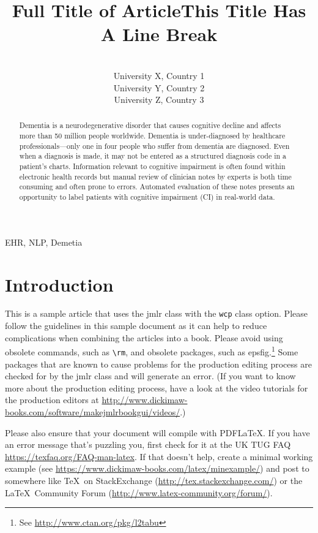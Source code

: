 \documentclass[pmlr,twocolumn,10pt]{jmlr} %
\title[Short Title]{Full Title of Article\titlebreak This Title Has
A Line Break}
\author{%
\Name{First Author 1}\equal{These authors contributed equally} \Email{abc@sample.com}\\
\addr University X, Country 1
\AND
\Name{First Author 2}\footnotemark[1] \Email{def@sample.com}\\
\addr University Y, Country 2
\AND
\Name{Last Author} \Email{ghi@sample.com}\\
\addr University Z, Country 3
}
\begin{document}
\maketitle

\begin{abstract}
\tab Dementia is a neurodegenerative disorder that causes cognitive decline and affects more than 50 million people worldwide. Dementia is under-diagnosed by healthcare professionals—only one in four people who suffer from dementia are diagnosed. Even when a diagnosis is made, it may not be entered as a structured diagnosis code in a patient’s charts.  Information relevant to cognitive impairment is often found within electronic health records but manual review of clinician notes by experts is both time consuming and often prone to errors. Automated evaluation of these notes presents an opportunity to label patients with cognitive impairment (CI) in real-world data. 
\end{abstract}
\begin{keywords}
EHR, NLP, Demetia
\end{keywords}

\section{Introduction}
\label{sec:intro}

This is a sample article that uses the \textsf{jmlr} class with
the \texttt{wcp} class option.  Please follow the guidelines in
this sample document as it can help to reduce complications when
combining the articles into a book. Please avoid using obsolete
commands, such as \verb|\rm|, and obsolete packages, such as
\textsf{epsfig}.\footnote{See
\url{http://www.ctan.org/pkg/l2tabu}} Some packages that are known
to cause problems for the production editing process are checked for
by the \textsf{jmlr} class and will generate an error. (If you want
to know more about the production editing process, have a look at
the video tutorials for the production editors at
\url{http://www.dickimaw-books.com/software/makejmlrbookgui/videos/}.)

Please also ensure that your document will compile with PDF\LaTeX.
If you have an error message that's puzzling you, first check for it
at the UK TUG FAQ
\url{https://texfaq.org/FAQ-man-latex}.  If
that doesn't help, create a minimal working example (see
\url{https://www.dickimaw-books.com/latex/minexample/}) and post
to somewhere like \TeX\ on StackExchange
(\url{http://tex.stackexchange.com/}) or the \LaTeX\ Community Forum
(\url{http://www.latex-community.org/forum/}).
\end{document}
